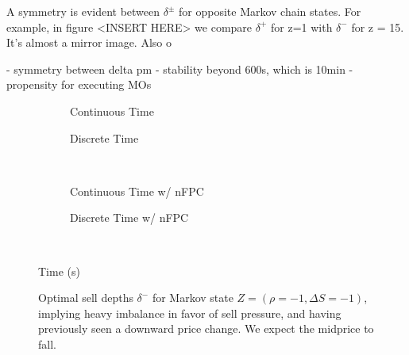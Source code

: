 A symmetry is evident between $\delta^\pm$ for opposite Markov chain states. For example, in figure <INSERT HERE> we compare $\delta^+$ for z=1 with $\delta^-$ for z = 15. It's almost a mirror image. Also o

- symmetry between delta pm
- stability beyond 600s, which is 10min
- propensity for executing MOs

\begin{figure}
\centering
\begin{subfigure}{.45\linewidth}
  \centering
  \setlength\figureheight{\linewidth} 
  \setlength\figurewidth{\linewidth}
  
  \caption{Continuous Time}
\end{subfigure}%
\hfill%
\begin{subfigure}{.45\linewidth}
  \centering
  \setlength\figureheight{\linewidth} 
  \setlength\figurewidth{\linewidth}
   
  \caption{Discrete Time}
\end{subfigure}\\
\vspace{1cm}
\begin{subfigure}{.45\linewidth}
  \centering
  \setlength\figureheight{\linewidth} 
  \setlength\figurewidth{\linewidth}
   
  \caption{Continuous Time w/ nFPC}
\end{subfigure}%
\hfill%
\begin{subfigure}{.45\linewidth}
  \centering
  \setlength\figureheight{\linewidth} 
  \setlength\figurewidth{\linewidth}
   
  \caption{Discrete Time w/ nFPC}
\end{subfigure}\\

\leavevmode{}\hspace{0pt plus 1filll}\null

Time (s)

\vspace{1cm}
\begin{subfigure}{\linewidth}
  \centering
   
\end{subfigure}%
  \caption{Optimal sell depths $\delta^{-}$ for Markov state $Z=(\rho = -1, \Delta S = -1)$, implying heavy imbalance in favor of sell pressure, and having previously seen a downward price change. We expect the midprice to fall.}
  \label{fig:comp_dm_z1}
\end{figure}

